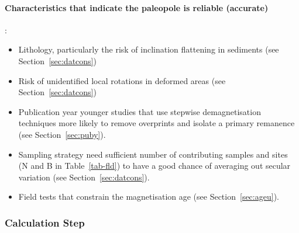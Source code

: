\paragraph{Characteristics that indicate the paleopole is reliable (accurate)}:
\begin{itemize}
  \item Lithology, particularly the risk of inclination flattening in sediments
    (see Section~\ref{sec:datcons})
  \item Risk of unidentified local rotations in deformed areas (see
    Section~\ref{sec:datcons})
  \item Publication year \textemdash{} younger studies that use stepwise
    demagnetisation techniques more likely to remove overprints and isolate a
    primary remanence (see Section~\ref{sec:puby}).
  \item Sampling strategy \textemdash{} need sufficient number of contributing
    samples and sites (N and B in Table~\ref{tab-fld}) to have a good chance of
    averaging out secular variation (see Section~\ref{sec:datcons}).
  \item Field tests that constrain the magnetisation age (see
    Section~\ref{sec:ageu}).
\end{itemize}

\subsubsection{Calculation Step}

